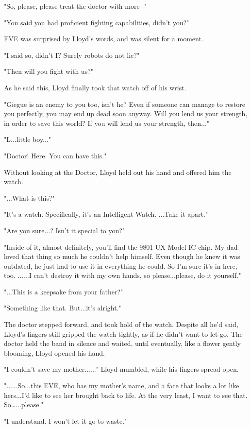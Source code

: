 \documentclass[
]{article}
\begin{document}
"So, please, please treat the doctor with more-\/-"

"You said you had proficient fighting capabilities, didn't you?"

EVE was surprised by Lloyd's words, and was silent for a moment.

"I said so, didn't I? Surely robots do not lie?"

"Then will you fight with us?"

As he said this, Lloyd finally took that watch off of his wrist.

"Giegue is an enemy to you too, isn't he? Even if someone can manage to
restore you perfectly, you may end up dead soon anyway. Will you lend us
your strength, in order to save this world? If you will lend us your
strength, then..."

"L...little boy..."

"Doctor! Here. You can have this."

Without looking at the Doctor, Lloyd held out his hand and offered him
the watch.

"...What is this?"

"It's a watch. Specifically, it's an Intelligent Watch. ...Take it
apart."

"Are you sure...? Isn't it special to you?"

"Inside of it, almost definitely, you'll find the 9801 UX Model IC chip.
My dad loved that thing so much he couldn't help himself. Even though he
knew it was outdated, he just had to use it in everything he could. So
I'm sure it's in here, too. ......I can't destroy it with my own hands,
so please...please, do it yourself."

"...This is a keepsake from your father?"

"Something like that. But...it's alright."

The doctor stepped forward, and took hold of the watch. Despite all he'd
said, Lloyd's fingers still gripped the watch tightly, as if he didn't
want to let go. The doctor held the band in silence and waited, until
eventually, like a flower gently blooming, Lloyd opened his hand.

"I couldn't save my mother......" Lloyd mumbled, while his fingers
spread open.

"......So...this EVE, who has my mother's name, and a face that looks a
lot like hers...I'd like to see her brought back to life. At the very
least, I want to see that. So\ldots...please."

"I understand. I won't let it go to waste."
\end{document}
